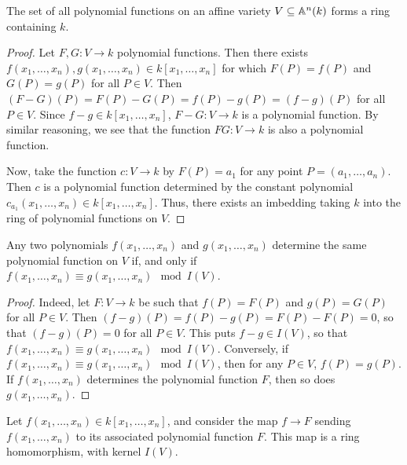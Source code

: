 \begin{proposition}\label{proposition_11.1.1}
  The set of all polynomial functions on an affine variety $V
  \subseteq \mathbb{A}^n(k)$ forms a ring containing $k$.
\end{proposition}
\begin{proof}
  Let $F,G:V \xrightarrow{} k$ polynomial functions. Then there
  exists $f(x_1, \dots, x_n),g(x_1, \dots, x_n) \in k[x_1, \dots,
  x_n]$ for which $F(P)=f(P)$ and $G(P)=g(P)$ for all $P \in V$.
  Then $(F-G)(P)=F(P)-G(P)=f(P)-g(P)=(f-g)(P)$ for all $P \in V$.
  Since $f-g \in k[x_1, \dots, x_n]$, $F-G:V \xrightarrow{} k$ is a
  polynomial function. By similar reasoning, we see that the
  function $FG:V \xrightarrow{} k$ is also a polynomial function.

  Now, take the function $c:V \xrightarrow{} k$ by $F(P)=a_1$ for
  any point $P=(a_1, \dots, a_n)$. Then $c$ is a polynomial function
  determined by the constant polynomial $c_{a_1}(x_1, \dots, x_n) \in
  k[x_1, \dots, x_n]$. Thus, there exists an imbedding taking $k$
  into the ring of polynomial functions on $V$.
\end{proof}
\begin{corollary}
  Any two polynomials $f(x_1, \dots, x_n)$ and $g(x_1, \dots, x_n)$
  determine the same polynomial function on $V$ if, and only if
  $f(x_1, \dots, x_n) \equiv g(x_1, \dots, x_n) \mod{I(V)}$.
\end{corollary}
\begin{proof}
  Indeed, let $F:V \xrightarrow{} k$ be such that $f(P)=F(P)$ and
  $g(P)=G(P)$ for all $P \in V$. Then
  $(f-g)(P)=f(P)-g(P)=F(P)-F(P)=0$, so that $(f-g)(P)=0$ for all $P
  \in V$. This puts $f-g \in I(V)$, so that $f(x_1, \dots, x_n) \equiv
  g(x_1, \dots, x_n) \mod{I(V)}$. Conversely, if $f(x_1, \dots, x_n)
  \equiv g(x_1, \dots, x_n) \mod{I(V)}$, then for any $P \in V$,
  $f(P)=g(P)$. If $f(x_1, \dots, x_n)$ determines the polynomial
  function $F$, then so does $g(x_1, \dots, x_n)$.
\end{proof}
\begin{corollary}
  Let $f(x_1, \dots, x_n) \in k[x_1, \dots, x_n]$, and consider the
  map $f \xrightarrow{} F$ sending $f(x_1, \dots, x_n)$ to its
  associated polynomial function $F$. This map is a ring
  homomorphism, with kernel $I(V)$.
\end{corollary}

